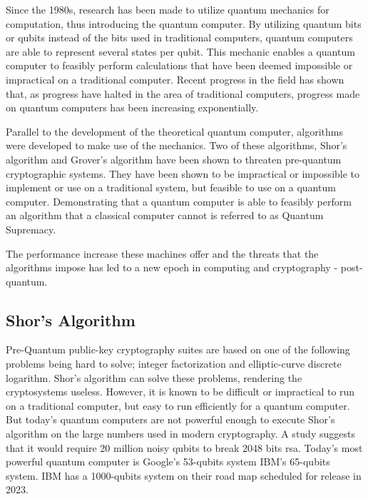 Since the 1980s, research has been made to utilize quantum mechanics for computation, thus introducing the quantum computer\cite{benioff1980}. By utilizing quantum bits or \glspl{qubit} instead of the bits used in traditional computers, quantum computers are able to represent several states per \gls{qubit}. This mechanic enables a quantum computer to feasibly perform calculations that have been deemed impossible or impractical on a traditional computer\cite{jordan2021}. Recent progress in the field has shown that, as progress have halted in the area of traditional computers, progress made on quantum computers has been increasing exponentially\cite{ibm2020:quantum-computer}.

Parallel to the development of the theoretical quantum computer, algorithms were developed to make use of the mechanics. Two of these algorithms, Shor's algorithm and Grover's algorithm have been shown to threaten pre-quantum cryptographic systems. They have been shown to be impractical or impossible to implement or use on a traditional system, but feasible to use on a quantum computer\cite{shor1997, jordan2021}. Demonstrating that a quantum computer is able to feasibly perform an algorithm that a classical computer cannot is referred to as Quantum Supremacy\cite{farhi2019}.

The performance increase these machines offer and the threats that the algorithms impose has led to a new epoch in computing and cryptography - post-quantum.

\subsection{Shor's Algorithm}

Pre-Quantum public-key cryptography suites are based on one of the following problems being hard to solve; integer factorization and elliptic-curve discrete logarithm. Shor's algorithm can solve these problems, rendering the cryptosystems useless\cite{shor1997}. However, it is known to be difficult or impractical to run on a traditional computer, but easy to run efficiently for a quantum computer. But today's quantum computers are not powerful enough to execute Shor's algorithm on the large numbers used in modern cryptography\cite{bernstein2017}. A study \cite{gidney2019} suggests that it would require 20 million noisy \glspl{qubit} to break 2048 bits \gls{rsa}. Today's most powerful quantum computer is Google's 53-\glspl{qubit} system\cite{google2019:quantum-computer} IBM's 65-\glspl{qubit} system\cite{ibm2020:quantum-computer}. IBM has a 1000-\glspl{qubit} system on their road map scheduled for release in 2023\cite{ibm2020:quantum-computer}.

